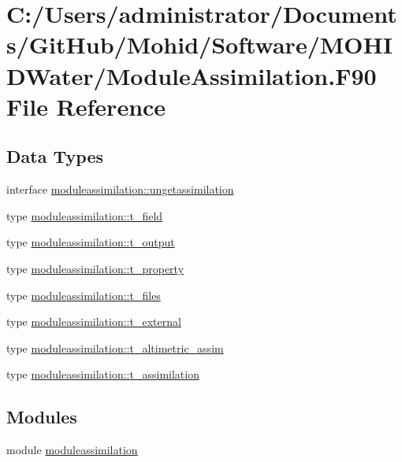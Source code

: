 \hypertarget{_module_assimilation_8_f90}{}\section{C\+:/\+Users/administrator/\+Documents/\+Git\+Hub/\+Mohid/\+Software/\+M\+O\+H\+I\+D\+Water/\+Module\+Assimilation.F90 File Reference}
\label{_module_assimilation_8_f90}
\subsection*{Data Types}
\begin{DoxyCompactItemize}
\item 
interface \mbox{\hyperlink{interfacemoduleassimilation_1_1ungetassimilation}{moduleassimilation\+::ungetassimilation}}
\item 
type \mbox{\hyperlink{structmoduleassimilation_1_1t__field}{moduleassimilation\+::t\+\_\+field}}
\item 
type \mbox{\hyperlink{structmoduleassimilation_1_1t__output}{moduleassimilation\+::t\+\_\+output}}
\item 
type \mbox{\hyperlink{structmoduleassimilation_1_1t__property}{moduleassimilation\+::t\+\_\+property}}
\item 
type \mbox{\hyperlink{structmoduleassimilation_1_1t__files}{moduleassimilation\+::t\+\_\+files}}
\item 
type \mbox{\hyperlink{structmoduleassimilation_1_1t__external}{moduleassimilation\+::t\+\_\+external}}
\item 
type \mbox{\hyperlink{structmoduleassimilation_1_1t__altimetric__assim}{moduleassimilation\+::t\+\_\+altimetric\+\_\+assim}}
\item 
type \mbox{\hyperlink{structmoduleassimilation_1_1t__assimilation}{moduleassimilation\+::t\+\_\+assimilation}}
\end{DoxyCompactItemize}
\subsection*{Modules}
\begin{DoxyCompactItemize}
\item 
module \mbox{\hyperlink{namespacemoduleassimilation}{moduleassimilation}}
\end{DoxyCompactItemize}

